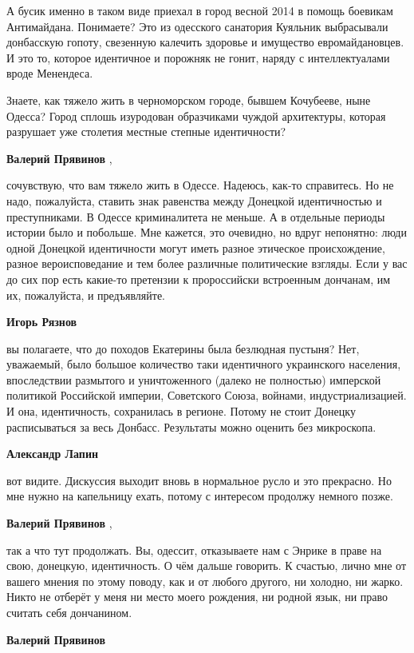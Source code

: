 \begin{itemize}
\begin{itemize}
А бусик именно в таком виде приехал в город весной 2014 в помощь боевикам
Антимайдана. Понимаете? Это из одесского санатория Куяльник выбрасывали
донбасскую гопоту, свезенную калечить здоровье и имущество евромайдановцев. И
это то, которое идентичное и порожняк не гонит, наряду с интеллектуалами вроде
Менендеса.

Знаете, как тяжело жить в черноморском городе, бывшем Кочубееве, ныне Одесса?
Город сплошь изуродован образчиками чуждой архитектуры, которая разрушает уже
столетия местные степные идентичности?

\textbf{Валерий Прявинов} , 

сочувствую, что вам тяжело жить в Одессе. Надеюсь, как-то справитесь. Но не
надо, пожалуйста, ставить знак равенства между Донецкой идентичностью и
преступниками. В Одессе криминалитета не меньше. А в отдельные периоды истории
было и побольше. Мне кажется, это очевидно, но вдруг непонятно: люди одной
Донецкой идентичности могут иметь разное этическое происхождение, разное
вероисповедание и тем более различные политические взгляды. Если у вас до сих
пор есть какие-то претензии к пророссийски встроенным дончанам, им их,
пожалуйста, и предъявляйте.

\textbf{Игорь Рязнов} 

вы полагаете, что до походов Екатерины была безлюдная пустыня? Нет, уважаемый,
было большое количество таки идентичного украинского населения, впоследствии
размытого и уничтоженного (далеко не полностью) имперской политикой Российской
империи, Советского Союза, войнами, индустриализацией. И она, идентичность,
сохранилась в регионе. Потому не стоит Донецку расписываться за весь Донбасс.
Результаты можно оценить без микроскопа.

\textbf{Александр Лапин} 

вот видите. Дискуссия выходит вновь в нормальное русло и это прекрасно. Но мне
нужно на капельницу ехать, потому с интересом продолжу немного позже.

\textbf{Валерий Прявинов} , 

так а что тут продолжать. Вы, одессит, отказываете нам с Энрике в праве на
свою, донецкую, идентичность. О чём дальше говорить. К счастью, лично мне от
вашего мнения по этому поводу, как и от любого другого, ни холодно, ни жарко.
Никто не отберёт у меня ни место моего рождения, ни родной язык, ни право
считать себя дончанином.

\textbf{Валерий Прявинов} 


\end{itemize}
\end{itemize}
